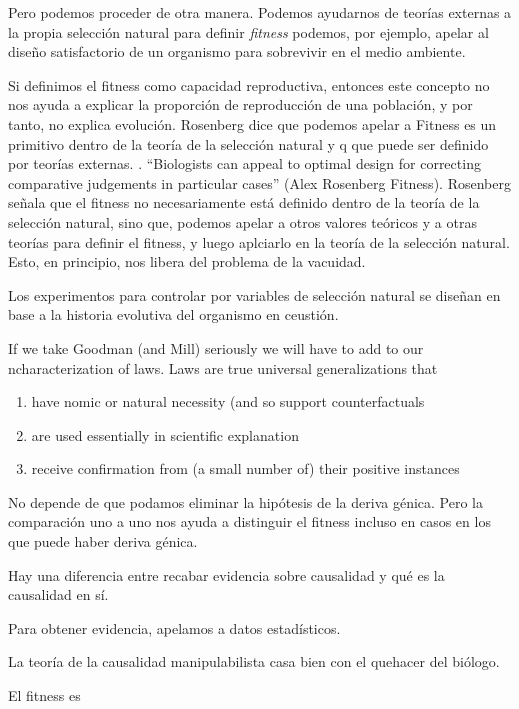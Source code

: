 Pero podemos proceder de otra manera. Podemos ayudarnos de teorías externas a la propia selección natural para definir \emph{fitness} podemos, por ejemplo, apelar al diseño satisfactorio de un organismo para sobrevivir en el medio ambiente.

Si definimos el fitness como capacidad reproductiva, entonces este concepto no nos ayuda a explicar la proporción de reproducción de una población, y por tanto, no explica evolución. Rosenberg dice que podemos apelar a Fitness es un primitivo dentro de la teoría de la selección natural y q  que puede ser definido por teorías externas. . ``Biologists can appeal to optimal design for correcting comparative judgements in particular cases'' (Alex Rosenberg Fitness). Rosenberg señala que el fitness no necesariamente está definido dentro de la teoría de la selección natural, sino que, podemos apelar a otros valores teóricos y a otras teorías para definir el fitness, y luego aplciarlo en la teoría de la selección natural. Esto, en principio, nos libera del problema de la vacuidad.

Los experimentos para controlar por variables de selección natural se diseñan en base a la historia evolutiva del organismo en ceustión.


If we take Goodman (and Mill) seriously we will have to add to our ncharacterization of laws. Laws are true universal generalizations that

\begin{enumerate}
  \item have nomic or natural necessity (and so support counterfactuals
  \item are used essentially in scientific explanation
  \item receive confirmation from (a small number of) their positive instances
  \end{enumerate}

No depende de que podamos eliminar la hipótesis de la deriva génica. Pero la comparación uno a uno nos ayuda a distinguir el fitness incluso en casos en los que puede haber deriva génica.



Hay una diferencia entre recabar evidencia sobre causalidad y qué es la causalidad en sí.

Para obtener evidencia, apelamos a datos estadísticos.

La teoría de la causalidad manipulabilista casa bien con el quehacer del biólogo.

El fitness es
